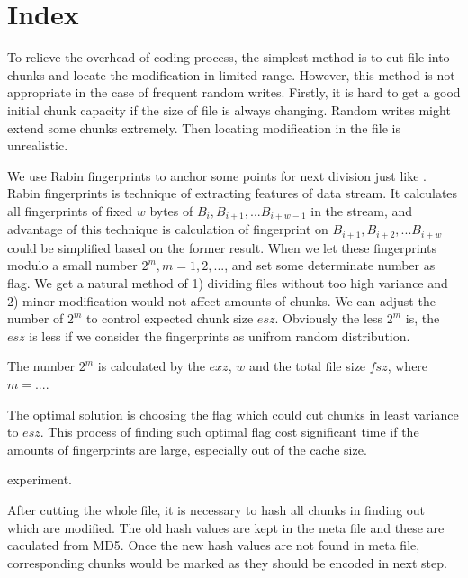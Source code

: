 \documentclass[a4paper, 12pt]{article}
\begin{document}
\section{Index}

To relieve the overhead of coding process, the simplest method is to
cut file into chunks and locate the modification in limited
range. However, this method is not appropriate in the case of frequent
random writes. Firstly, it is hard to get a good initial chunk
capacity if the size of file is always changing. Random writes might
extend some chunks extremely. Then locating modification in the file
is unrealistic. 

We use Rabin fingerprints to anchor some points for next division just
like \cite{index}. Rabin fingerprints is technique of extracting
features of data stream. It calculates all fingerprints of fixed $w$
bytes of $B_i, B_{i+1}, ... B_{i+w-1}$ in the stream, and advantage of
this technique is calculation of fingerprint on $B_{i+1}, B_{i+2},
... B_{i+w}$ could be simplified based on the former result. When we
let these fingerprints modulo a small number $2^m, m = 1, 2, ...$, and
set some determinate number as flag. We get a natural method of
1) dividing files without too high variance and 2) minor modification
would not affect amounts of chunks. We can adjust the number of $2^m$
to control expected chunk size $esz$. Obviously the less $2^m$ is, the
$esz$ is less if we consider the fingerprints as unifrom random
distribution. 

The number $2^m$ is calculated by the $exz$, $w$ and the total file
size $fsz$, where $m = ...$. 

The optimal solution is choosing the flag which could cut chunks in
least variance to $esz$. This process of finding such optimal flag
cost significant time if the amounts of fingerprints are large,
especially out of the cache size. 

experiment.

After cutting the whole file, it is necessary to hash all chunks in
finding out which are modified. The old hash values are kept in the
meta file and these are caculated from MD5. Once the new hash values
are not found in meta file, corresponding chunks would be marked as
they should be encoded in next step. 
\end{document}
